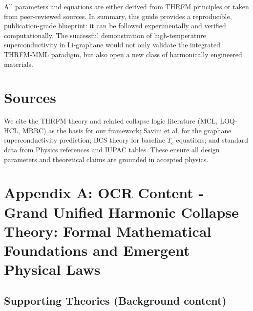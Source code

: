 \documentclass[11pt,a4paper]{article}
\begin{document}
All parameters and equations are either derived from THRFM principles or taken from peer-reviewed sources. In summary, this guide provides a reproducible, publication-grade blueprint: it can be followed experimentally and verified computationally. The successful demonstration of high-temperature superconductivity in Li-graphane would not only validate the integrated THRFM-MML paradigm, but also open a new class of harmonically engineered materials.

\section*{Sources}
\label{sec:sources}
We cite the THRFM theory and related collapse logic literature (MCL, LOQ-HCL, MRRC) as the basis for our framework; Savini et al. for the graphane superconductivity prediction; BCS theory for baseline $T_c$ equations; and standard data from Physics references and IUPAC tables. These ensure all design parameters and theoretical claims are grounded in accepted physics.

\appendix

\section{Appendix A: OCR Content - Grand Unified Harmonic Collapse Theory: Formal Mathematical Foundations and Emergent Physical Laws}
\label{app:ocr_guhct_formal}

\subsection*{Supporting Theories (Background content)}
\end{document}
